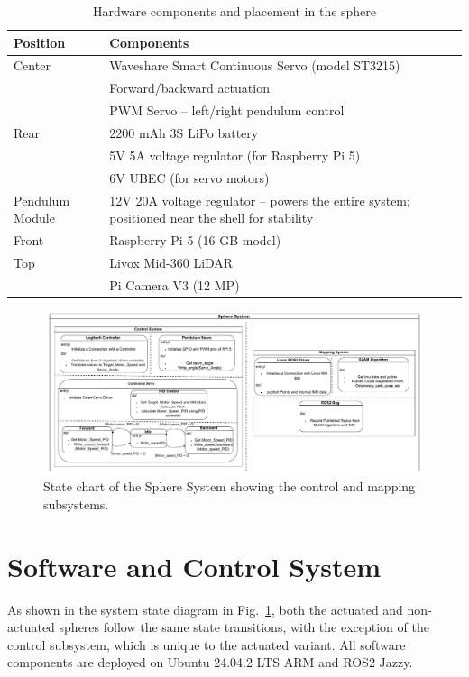 \documentclass[a4paper, conference]{IEEEtran}
\begin{document}
\begin{table}
\centering
\caption{Hardware components and placement in the sphere}
\label{tab:hardware_components_actuated}
\begin{tabularx}{\linewidth}{@{}l X@{}}
\toprule
\textbf{Position} & \textbf{Components} \\
\midrule
Center & Waveshare Smart Continuous Servo (model ST3215) \\
       & Forward/backward actuation \\
       & PWM Servo – left/right pendulum control \\
Rear   & 2200 mAh 3S LiPo battery \\
       & 5V 5A voltage regulator (for Raspberry Pi 5) \\
       & 6V UBEC (for servo motors) \\
Pendulum Module & 12V 20A voltage regulator – powers the entire system; positioned near the shell for stability \\
Front  & Raspberry Pi 5 (16 GB model) \\
Top    & Livox Mid-360 LiDAR \\
       & Pi Camera V3 (12 MP) \\
\bottomrule
\end{tabularx}
\vspace{-4mm}
\end{table}

\begin{figure}
    \centering
    \includegraphics[width=1\linewidth]{pics/Khonsu_diagram.pdf} 
    \caption{State chart of the Sphere System showing the control and mapping subsystems.}
    \label{fig:sphere_system}
\end{figure}

\section{Software and Control System}
As shown in the system state diagram in Fig.~\ref{fig:sphere_system}, both the actuated and non-actuated spheres follow the same state transitions, with the exception of the control subsystem, which is unique to the actuated variant. 
All software components are deployed on Ubuntu 24.04.2 LTS ARM and ROS2 Jazzy.
\end{document}
